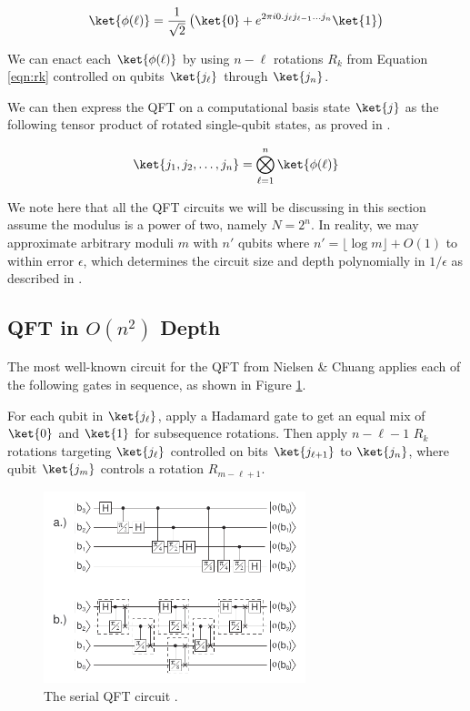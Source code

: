 \begin{equation}
\ket{\phi(\ell)} = \frac{1}{\sqrt{2}}\left( \ket{0} +
e^{2\pi i 0.j_\ell j_{\ell-1} \ldots j_n} \ket{1} \right)
\end{equation}

We can enact each $\ket{\phi(\ell)}$ by using $n-\ell$ rotations
$R_k$ from Equation \ref{eqn:rk} controlled on qubits $\ket{j_\ell}$
through $\ket{j_n}$.

We can then express the QFT on a computational basis state $\ket{j}$ as
the following tensor product of rotated single-qubit states, as proved in
\cite{Nielsen2000}.

\begin{equation}
\ket{j_1, j_2, \ldots, j_n} = \bigotimes_{\ell=1}^{n} \ket{\phi(\ell)}
\end{equation}


We note here that all the QFT circuits we will be discussing in this section
assume the modulus is a power of two, namely $N=2^n$. In reality, we may
approximate arbitrary moduli $m$ with $n'$ qubits where
$n' = \lfloor\log m\rfloor + O(1)$ to within error $\epsilon$, which determines
the circuit size and depth polynomially in $1/\epsilon$
as described in \cite{Cleve2000}.

\subsection{QFT in $O(n^2)$ Depth}
\label{subsec:qft-quad}

The most well-known circuit for the QFT from Nielsen \& Chuang
\cite{Nielsen2000} applies each of the following gates in sequence, as shown
in Figure \ref{fig:qft-serial}.

For each qubit in $\ket{j_\ell}$, apply a Hadamard gate to get an equal mix of
$\ket{0}$ and $\ket{1}$ for subsequence rotations. Then apply $n-\ell-1$
$R_k$ rotations targeting $\ket{j_\ell}$ controlled on bits $\ket{j_{\ell+1}}$
to $\ket{j_n}$, where qubit $\ket{j_m}$ controls a rotation $R_{m-\ell+1}$.

\begin{figure}[h!]
\begin{center}
\includegraphics[width=3in]{figures/serial_qft.pdf}
\caption{The serial QFT circuit \cite{Fowler2004}.}
\label{fig:qft-serial}
\end{center}
\end{figure}

